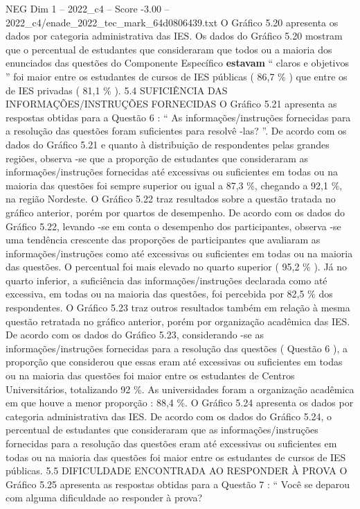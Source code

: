 \begin{textsample}{NEG Dim 1 – 2022\_c4 – Score -3.00 – 2022\_c4/enade\_2022\_tec\_mark\_64d0806439.txt}
O Gráfico 5.20 apresenta os dados por categoria administrativa das IES.
Os dados do Gráfico 5.20 mostram que o percentual de estudantes que consideraram que todos ou a maioria dos enunciados das questões do Componente Específico \textbf{estavam} “ claros e objetivos ” foi maior entre os estudantes de cursos de IES públicas ( 86,7 \% ) que entre os de IES privadas ( 81,1 \% ). 5.4 SUFICIÊNCIA DAS INFORMAÇÕES/INSTRUÇÕES FORNECIDAS O Gráfico 5.21 apresenta as respostas obtidas para a Questão 6 : “ As informações/instruções fornecidas para a resolução das questões foram suficientes para resolvê -las? ”.
De acordo com os dados do Gráfico 5.21 e quanto à distribuição de respondentes pelas grandes regiões, observa -se que a proporção de estudantes que consideraram as informações/instruções fornecidas até excessivas ou suficientes em todas ou na maioria das questões foi sempre superior ou igual a 87,3 \%, chegando a 92,1 \%, na região Nordeste.
O Gráfico 5.22 traz resultados sobre a questão tratada no gráfico anterior, porém por quartos de desempenho.
De acordo com os dados do Gráfico 5.22, levando -se em conta o desempenho dos participantes, observa -se uma tendência crescente das proporções de participantes que avaliaram as informações/instruções como até excessivas ou suficientes em todas ou na maioria das questões.
O percentual foi mais elevado no quarto superior ( 95,2 \% ).
Já no quarto inferior, a suficiência das informações/instruções declarada como até excessiva, em todas ou na maioria das questões, foi percebida por 82,5 \% dos respondentes.
O Gráfico 5.23 traz outros resultados também em relação à mesma questão retratada no gráfico anterior, porém por organização acadêmica das IES.
De acordo com os dados do Gráfico 5.23, considerando -se as informações/instruções fornecidas para a resolução das questões ( Questão 6 ), a proporção que considerou que essas eram até excessivas ou suficientes em todas ou na maioria das questões foi maior entre os estudantes de Centros Universitários, totalizando 92 \%.
As universidades foram a organização acadêmica em que houve a menor proporção : 88,4 \%.
O Gráfico 5.24 apresenta os dados por categoria administrativa das IES.
De acordo com os dados do Gráfico 5.24, o percentual de estudantes que consideraram que as informações/instruções fornecidas para a resolução das questões eram até excessivas ou suficientes em todas ou na maioria das questões foi maior entre os estudantes de cursos de IES públicas. 5.5 DIFICULDADE ENCONTRADA AO RESPONDER À PROVA O Gráfico 5.25 apresenta as respostas obtidas para a Questão 7 : “ Você se deparou com alguma dificuldade ao responder à prova?

\end{textsample}
